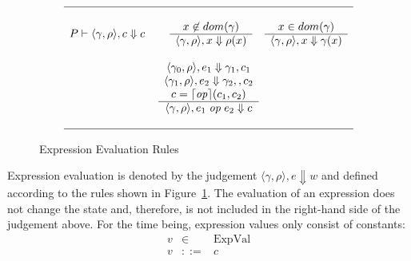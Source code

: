 \documentclass[10pt,notitlepage,twoside]{article}
\newcommand{\means}[1]{\lceil #1 \rceil}
\newcommand{\eval}[2]{P \vdash #1 \Downarrow #2}
\newcommand{\evale}[2]{#1 \Downarrow #2}
\newcommand{\state}[1]{\langle #1 \rangle}
\newcommand{\genv}{\gamma}
\begin{document}
\begin{figure}[tbp]
\begin{displaymath}
\begin{array}{c}
\hline
\ \\
\eval{\state{\genv,\rho},c}{c}  \;\;\;\;\;\;\;\;
\begin{array}{c}
x \not\in dom(\genv) \\
\hline
\evale{\state{\genv,\rho},x}{\rho(x)}
\end{array} 
\;\;\;\;
\begin{array}{c}
x \in dom(\genv) \\
\hline
\evale{\state{\genv,\rho},x}{\genv(x)}
\end{array} \\
\ \\
\begin{array}{c}
\evale{\state{\genv_0,\rho},e_1}{\genv_1,c_1} \\
 \evale{\state{\genv_1,\rho},e_2}{\genv_2,,c_2} \\
c = \means{\mathit{op}}(c_1,c_2) \\
\hline
\evale{\state{\genv,\rho},{e_1\;\mathit{op}\;e_2}}{c}
\end{array} \\
\ \\
\hline
\end{array}
\end{displaymath}
\caption{Expression Evaluation Rules}\label{fig:bigstep-expressions}
\end{figure}

Expression evaluation is denoted by the judgement $\evale{\state{\genv,\rho},e}{w}$ and defined according to the rules shown in Figure~\ref{fig:bigstep-expressions}.
The evaluation of an expression does not change the state and, therefore, is not included in the right-hand side of the judgement above.
For the time being, expression values only consist of constants:
\begin{displaymath}
\begin{array}{rcl}
v & \in &  \textrm{ExpVal} \\
v & ::= & c  \\
\end{array}
\end{displaymath}

\end{document}
